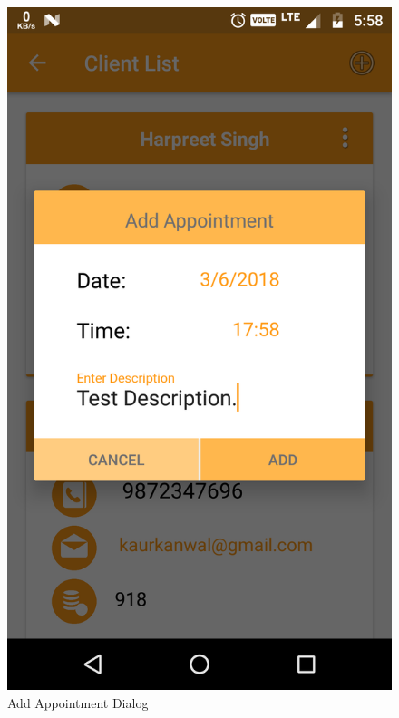 \\
\begin{figure}[h]
	\centering
	\includegraphics[width=0.7\linewidth]{AddAppointmentDialog}
	\caption{Add Appointment Dialog}
\end{figure}
\pagebreak

